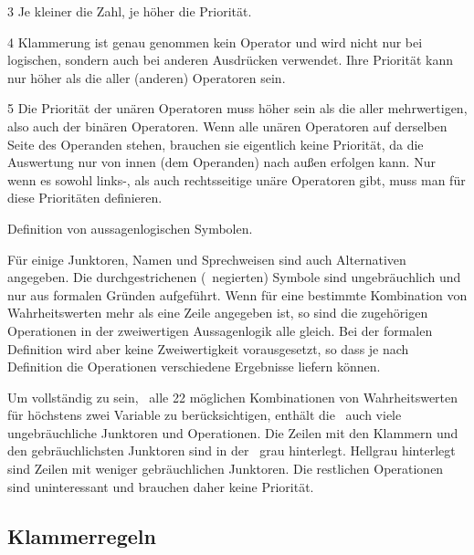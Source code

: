 \begin{table}
\begin{threeparttable}
\begin{tablenotes}
			\item[3] Je kleiner die Zahl, je höher die Priorität.

			\item[4] Klammerung ist genau genommen kein Operator und wird nicht nur bei logischen, sondern auch bei anderen Ausdrücken verwendet. Ihre Priorität kann nur höher als die aller (anderen) Operatoren sein.

			\item[5] Die Priorität der unären Operatoren muss höher sein als die aller mehrwertigen, also auch der binären Operatoren.
			Wenn alle unären Operatoren auf derselben Seite des Operanden stehen, brauchen sie eigentlich keine Priorität, da die Auswertung nur von innen (dem Operanden) nach außen erfolgen kann.
			Nur wenn es sowohl links-, als auch rechtsseitige unäre Operatoren gibt, muss man für diese Prioritäten definieren.

		\end{tablenotes}
	\end{threeparttable}
	\caption{Definition von aussagenlogischen Symbolen.}
	\label{tab:Symbole}%
\end{table}

Für einige Junktoren, Namen und Sprechweisen sind auch Alternativen angegeben.
Die durchgestrichenen (\textdh\ negierten) Symbole sind ungebräuchlich und nur aus formalen Gründen aufgeführt.
Wenn für eine bestimmte Kombination von Wahrheitswerten mehr als eine Zeile angegeben ist, so sind die zugehörigen Operationen in der zweiwertigen Aussagenlogik alle gleich.
Bei der formalen Definition wird aber keine Zweiwertigkeit vorausgesetzt, so dass je nach Definition die Operationen verschiedene Ergebnisse liefern können.

Um vollständig zu sein, \textdh\ alle 22 möglichen Kombinationen von Wahrheitswerten für höchstens zwei Variable zu berücksichtigen, enthält die \tablename\ auch viele ungebräuchliche Junktoren und Operationen.
Die Zeilen mit den Klammern und den gebräuchlichsten Junktoren sind in der \tablename\ grau hinterlegt.
Hellgrau hinterlegt sind Zeilen mit weniger gebräuchlichen Junktoren.
Die restlichen Operationen sind uninteressant und brauchen daher keine Priorität.

\subsection{Klammerregeln}%
\label{sub:Klammerregeln}

